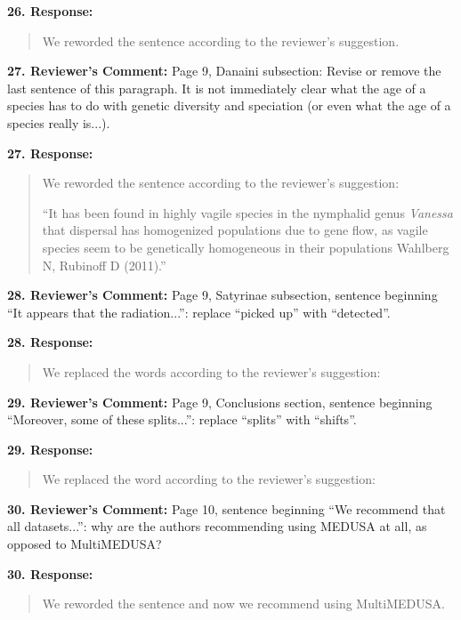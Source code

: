\documentclass[]{article}
\begin{document}
\textbf{26. Response:}

\begin{quote}
\color{blue}
We reworded the sentence according to the reviewer's suggestion.
\end{quote}


\textbf{27. Reviewer's Comment:}
Page 9, Danaini subsection: Revise or remove the last sentence of this 
paragraph. It is not immediately clear what the age of a species has to do 
with genetic diversity and speciation (or even what the age of a species 
really is...).

\textbf{27. Response:}

\begin{quote}
\color{blue}
We reworded the sentence according to the reviewer's suggestion:

``It has been found
in highly vagile species in the nymphalid genus \emph{Vanessa} that
dispersal has homogenized populations due to gene flow, as 
vagile species seem to be genetically homogeneous in their
populations Wahlberg N, Rubinoff D (2011).''
\end{quote}



\textbf{28. Reviewer's Comment:}
Page 9, Satyrinae subsection, sentence beginning “It appears that the 
radiation...”: replace “picked up” with “detected”.

\textbf{28. Response:}

\begin{quote}
\color{blue}
We replaced the words according to the reviewer's suggestion:
\end{quote}


\textbf{29. Reviewer's Comment:}
Page 9, Conclusions section, sentence beginning “Moreover, some of these
splits...”: replace “splits” with “shifts”.

\textbf{29. Response:}
\begin{quote}
\color{blue}
We replaced the word according to the reviewer's suggestion:
\end{quote}


\textbf{30. Reviewer's Comment:}
Page 10, sentence beginning “We recommend that all datasets...”: why are the
authors recommending using MEDUSA at all, as opposed to MultiMEDUSA?

\textbf{30. Response:}
\begin{quote}
\color{blue}
We reworded the sentence and now we recommend using MultiMEDUSA.
\end{quote}
\end{document}
